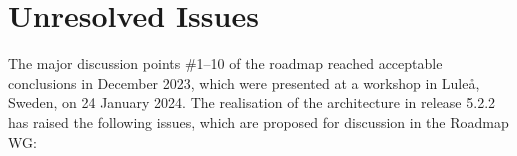 \documentclass[a4paper]{arrowhead}
\newcommand{\sys}[1]{\textcolor{ArrowheadBlue}{\textbf{\ahbreak{#1}}}}      %
\newcommand{\svc}[1]{\textcolor{ArrowheadPurple}{\textit{\ahbreak{#1}}}}    %
\begin{document}


\section{Unresolved Issues}
\label{sec:issues}

The major discussion points \#1--10 of the roadmap reached acceptable conclusions in December
2023, which were presented at a workshop in Lule\aa{}, Sweden, on 24 January 2024. The
realisation of the architecture in release 5.2.2 has raised the following issues, which are
proposed for discussion in the Roadmap WG:
\end{document}
